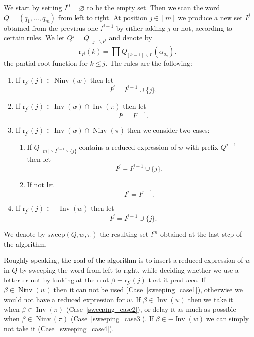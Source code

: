 \documentclass{amsart}
\theoremstyle{definition}
\DeclareMathOperator{\Inv}{Inv} %
\DeclareMathOperator{\Ninv}{Ninv} %
\newcommand{\defn}[1]{\textbf{\textsf{\color{PineGreen} #1}}} %
\newcommand{\rootFunction}[2]{\mathrm{r}_{#1}(#2)} %
\newcommand{\sweepingAlgorithm}{\mathrm{sweep}} %
\begin{document}
We start by setting $I^0=\varnothing$ to be the empty set.
Then we scan the word $Q=(q_1,\dots ,q_m)$ from left to right.
At position $j\in [m]$ we produce a new set $I^j$ obtained from the previous one $I^{j-1}$ by either adding $j$ or not, according to certain rules.
We let $Q^j=Q_{[j]\smallsetminus I^j}$ and denote by
    \[
    \rootFunction{I^j}{k} = \prod Q_{[k-1]\smallsetminus I^j}(\alpha_{q_k}).
    \]
the partial root function for $k\leq j$.  
The rules are the following:

\begin{enumerate}
    \item If $\rootFunction{I^j}{j}\in \Ninv(w)$ then let 
    \[
    I^j=I^{j-1}\cup\{j\}.
    \] 
    \label{sweeping_case1}
    \item If $\rootFunction{I^j}{j}\in \Inv(w) \cap \Inv (\pi)$ then let 
    \[
    I^j=I^{j-1}.
    \]
    \label{sweeping_case2}
    \item If $\rootFunction{I^j}{j}\in \Inv(w) \cap \Ninv (\pi)$ then we consider two cases: 
    \label{sweeping_case3} 
    \begin{enumerate}
        \item If $Q_{[m]\smallsetminus I^{j-1}\smallsetminus \{j\}}$ contains a reduced expression of $w$ with prefix $Q^{j-1}$ then let 
        \[
        I^j=I^{j-1}\cup \{j\}.
        \]        
        \label{sweeping_case3a}
        \item If not let 
        \[
        I^j=I^{j-1}.
        \]
        \label{sweeping_case3b}
    \end{enumerate}
    \item If $\rootFunction{I^j}{j}\in -\Inv(w)$ then let
    \[
    I^j=I^{j-1}\cup \{j\}.
    \]
    \label{sweeping_case4}
\end{enumerate}

We denote by \defn{$\sweepingAlgorithm(Q,w,\pi)$} the resulting set $I^m$ obtained at the last step of the algorithm.

Roughly speaking, the goal of the algorithm is to insert a reduced expression of $w$ in $Q$ by sweeping the word from left to right, while deciding whether we use a letter or not by looking at the root $\beta=\rootFunction{I^j}{j}$ that it produces.
If $\beta \in \Ninv(w)$ then it can not be used (Case~\eqref{sweeping_case1}), otherwise we would not have a reduced expression for $w$.
If $\beta \in \Inv(w)$ then we take it when $\beta \in \Inv(\pi)$ (Case~\eqref{sweeping_case2}), or delay it as much as possible when $\beta \in \Ninv(\pi)$ (Case~\eqref{sweeping_case3}).
If $\beta \in -\Inv(w)$ we can simply not take it (Case~\eqref{sweeping_case4}).
\end{document}
